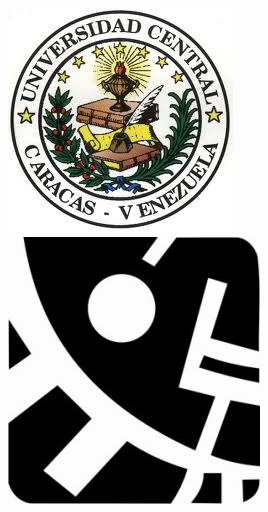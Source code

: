 \label{ch:portada}
\thispagestyle{empty}

\begin{figure}[!htb]
	\raggedright
	\includegraphics[width=\linewidth]{img/ucv.jpg}
	\endminipage\hfill
	\raggedleft
	\includegraphics[width=\linewidth]{img/ciens.jpg}
	\endminipage\hfill
\end{figure}

